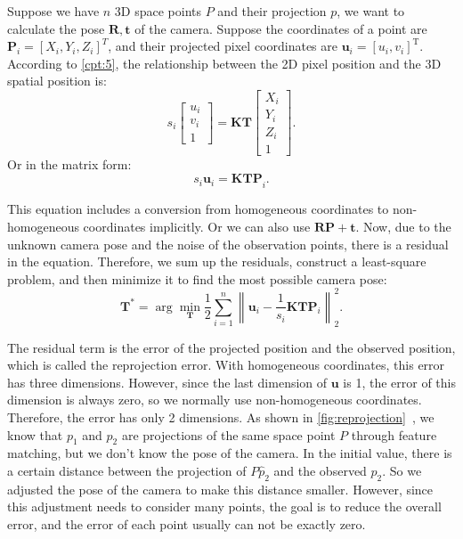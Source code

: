 Suppose we have $n$ 3D space points $P$ and their projection $p$, we want to calculate the pose $\mathbf{R}, \mathbf{t}$ of the camera. Suppose the coordinates of a point are $\mathbf{P}_i=[X_i,Y_i,Z_i]^T$, and their projected pixel coordinates are $\mathbf{u}_i=[u_i,v_i]^ \mathrm{T}$. According to \ref{cpt:5}, the relationship between the 2D pixel position and the 3D spatial position is:
\begin{equation}
s_i \left[ 
\begin{array}{l}
u_i \\ v_i \\ 1
\end{array}
\right] = \mathbf{K} \mathbf{T} \left[ 
\begin{array}{l}
X_i \\ Y_i \\ Z_i \\ 1
\end{array} \right]  .
\end{equation}
Or in the matrix form:
\[
{{s_i {\mathbf{u}}_i} = \mathbf{K} \mathbf{T} \mathbf{P}}_i.
\]

This equation includes a conversion from homogeneous coordinates to non-homogeneous coordinates implicitly. Or we can also use $\mathbf{R}\mathbf{P}+\mathbf{t}$. Now, due to the unknown camera pose and the noise of the observation points, there is a residual in the equation. Therefore, we sum up the residuals, construct a least-square problem, and then minimize it to find the most possible camera pose:
\begin{equation}
{\mathbf{T}^*} = \arg \mathop {\min }\limits_{\mathbf{T}}  \frac{1}{2}\sum\limits_{i = 1}^n {\left\| {{{\mathbf{u}}_i} - \frac{1}{s_i} \mathbf{K}\mathbf{T}{\mathbf{P}}_i} \right\|_2^2} .
\end{equation}

The residual term is the error of the projected position and the observed position, which is called the reprojection error. With homogeneous coordinates, this error has three dimensions. However, since the last dimension of ${\mathbf{u}}$ is 1, the error of this dimension is always zero, so we normally use non-homogeneous coordinates. Therefore, the error has only 2 dimensions. As shown in \autoref{fig:reprojection}~, we know that $p_1$ and $p_2$ are projections of the same space point $P$ through feature matching, but we don't know the pose of the camera. In the initial value, there is a certain distance between the projection of $P \hat{p}_2$ and the observed $p_2$. So we adjusted the pose of the camera to make this distance smaller. However, since this adjustment needs to consider many points, the goal is to reduce the overall error, and the error of each point usually can not be exactly zero.

